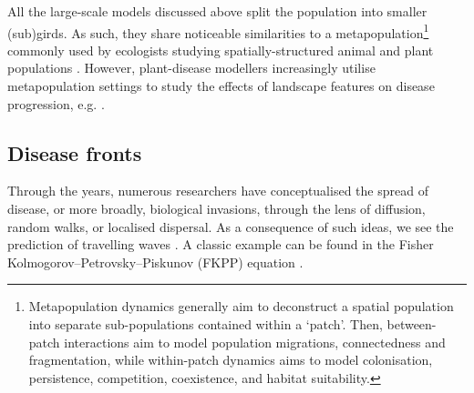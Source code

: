 All the large-scale models discussed above split the population into smaller (sub)girds.
As such, they share noticeable similarities to a metapopulation\footnote{
Metapopulation dynamics generally aim to deconstruct a spatial population into separate sub-populations contained within a `patch'. Then, between-patch interactions aim to model population migrations, connectedness and fragmentation, while within-patch
dynamics aims to model colonisation, persistence, competition, coexistence, and habitat suitability.} commonly used by ecologists studying spatially-structured animal and plant populations \cite{hanski1998metapopulation}. 
However, plant-disease modellers increasingly utilise metapopulation settings to study the effects of landscape features on disease progression, e.g. \cite{beninca2020trade, soubeyrand2009spatiotemporal, doi:10.1046/j.1461-0248.2002.00378.x}.
 

\newpage

\subsection{Disease fronts}

Through the years, numerous researchers have conceptualised the spread of disease, or more broadly, biological invasions, 
through the lens of diffusion, random walks, or localised dispersal. As a consequence of such ideas, we see the prediction
of travelling waves \cite{skellam1951random, mollison1977spatial, GRASSBERGER1983157, ferrandino1993dispersive}.
A classic example can be found in the Fisher Kolmogorov–Petrovsky–Piskunov (FKPP) equation \cite{fisher1937wave}.

